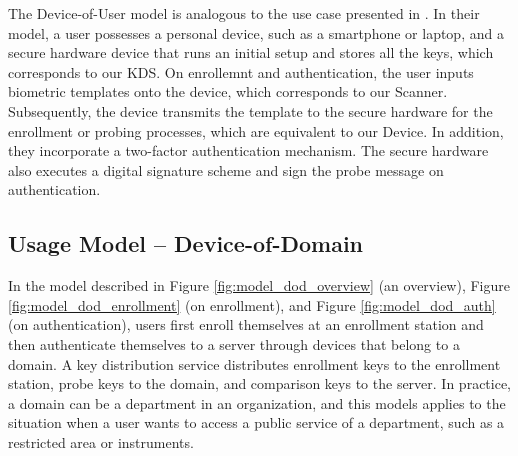 The Device-of-User model is analogous to the use case presented in \cite{cryptoeprint:2023/481}. In their model, a user possesses a personal device, such as a smartphone or laptop, and a secure hardware device that runs an initial setup and stores all the keys, which corresponds to our \textsf{KDS}. On enrollemnt and authentication, the user inputs biometric templates onto the device, which corresponds to our \textsf{Scanner}. Subsequently, the device transmits the template to the secure hardware for the enrollment or probing processes, which are equivalent to our \textsf{Device}. In addition, they incorporate a two-factor authentication mechanism. The secure hardware also executes a digital signature scheme and sign the probe message on authentication.




\subsection{Usage Model – Device-of-Domain}
\label{sec:dod_model}

In the model described in Figure \ref{fig:model_dod_overview} (an overview), Figure \ref{fig:model_dod_enrollment} (on enrollment), and Figure \ref{fig:model_dod_auth} (on authentication), users first enroll themselves at an enrollment station and then authenticate themselves to a server through devices that belong to a domain.
A key distribution service distributes enrollment keys to the enrollment station, probe keys to the domain, and comparison keys to the server. In practice, a domain can be a department in an organization, and this models applies to the situation when a user wants to access a public service of a department, such as a restricted area or instruments. 

